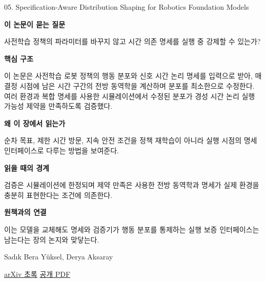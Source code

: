 \documentclass[11pt,openany]{book}
\begin{document}
\begin{termcard}{05. Specification-Aware Distribution Shaping for Robotics Foundation Models}

\par

\medskip

{\sffamily\bfseries\color{deepblue} 이 논문이 묻는 질문}\par

사전학습 정책의 파라미터를 바꾸지 않고 시간 의존 명세를 실행 중 강제할 수 있는가?

\smallskip

{\sffamily\bfseries\color{deepblue} 핵심 구조}\par

이 논문은 사전학습 로봇 정책의 행동 분포와 신호 시간 논리 명세를 입력으로 받아, 매 결정 시점에 남은 시간 구간의 전방 동역학을 계산하며 분포를 최소한으로 수정한다. 여러 환경과 복합 명세를 사용한 시뮬레이션에서 수정된 분포가 경성 시간 논리 실행 가능성 제약을 만족하도록 검증했다.

\smallskip

{\sffamily\bfseries\color{deepblue} 왜 이 장에서 읽는가}\par

순차 목표, 제한 시간 방문, 지속 안전 조건을 정책 재학습이 아니라 실행 시점의 명세 인터페이스로 다루는 방법을 보여준다.

\smallskip

{\sffamily\bfseries\color{coral} 읽을 때의 경계}\par

검증은 시뮬레이션에 한정되며 제약 만족은 사용한 전방 동역학과 명세가 실제 환경을 충분히 표현한다는 조건에 의존한다.

\smallskip

{\sffamily\bfseries\color{teal} 원책과의 연결}\par

이는 모델을 교체해도 명세와 검증기가 행동 분포를 통제하는 실행 보증 인터페이스는 남는다는 장의 논지와 맞닿는다.

\medskip

{\footnotesize\color{muted} Sadık Bera Yüksel, Derya Aksaray\par

\href{https://arxiv.org/abs/2603.17969}{arXiv 초록} \quad \href{https://arxiv.org/pdf/2603.17969}{공개 PDF}\par}

\end{termcard}
\end{document}
